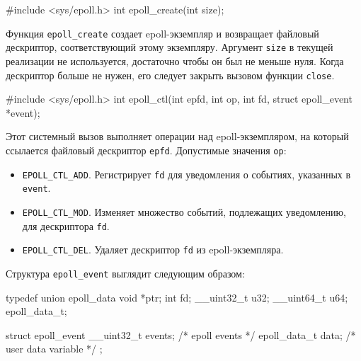 \begin{clst}{}{}
#include <sys/epoll.h>
int epoll_create(int size);
\end{clst}

Функция \lstinline{epoll_create} создает epoll-экземпляр и возвращает файловый дескриптор, соответствующий этому экземпляру. Аргумент \lstinline{size} в текущей реализации не используется, достаточно чтобы он был не меньше нуля. Когда дескриптор больше не нужен, его следует закрыть вызовом функции \lstinline{close}.

\begin{clst}{}{}
#include <sys/epoll.h>
int epoll_ctl(int epfd, int op, int fd, struct epoll_event *event);
\end{clst}

Этот системный вызов выполняет операции над epoll-экземпляром, на который ссылается файловый дескриптор \lstinline{epfd}. Допустимые значения \lstinline{op}:
\begin{itemize}
  \item \lstinline{EPOLL_CTL_ADD}. Регистрирует \lstinline{fd} для уведомления о событиях, указанных в \lstinline{event}.
  \item \lstinline{EPOLL_CTL_MOD}. Изменяет множество событий, подлежащих уведомлению, для дескриптора \lstinline{fd}.
  \item \lstinline{EPOLL_CTL_DEL}. Удаляет дескриптор \lstinline{fd} из epoll-экземпляра.
\end{itemize}

Структура \lstinline{epoll_event} выглядит следующим образом:
\begin{clst}{}{}
typedef union epoll_data {
    void        *ptr;
    int          fd;
    __uint32_t   u32;
    __uint64_t   u64;
} epoll_data_t;

struct epoll_event {
    __uint32_t   events;      /* epoll events */
    epoll_data_t data;        /* user data variable */
};
\end{clst}

